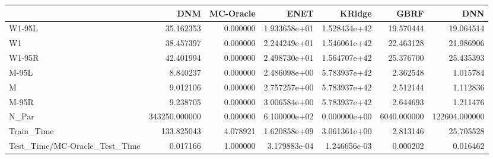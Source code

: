 \begin{tabular}{lrrrrrr}
\toprule
{} &            DNM &  MC-Oracle &          ENET &        KRidge &         GBRF &            DNN \\
\midrule
W1-95L                        &      35.162353 &   0.000000 &  1.933658e+01 &  1.528434e+42 &    19.570444 &      19.064514 \\
W1                            &      38.457397 &   0.000000 &  2.244249e+01 &  1.546061e+42 &    22.463128 &      21.986906 \\
W1-95R                        &      42.401994 &   0.000000 &  2.498730e+01 &  1.564707e+42 &    25.376700 &      25.435393 \\
M-95L                         &       8.840237 &   0.000000 &  2.486098e+00 &  5.783937e+42 &     2.362548 &       1.015784 \\
M                             &       9.012106 &   0.000000 &  2.757257e+00 &  5.783937e+42 &     2.512144 &       1.112836 \\
M-95R                         &       9.238705 &   0.000000 &  3.006584e+00 &  5.783937e+42 &     2.644693 &       1.211476 \\
N\_Par                         &  343250.000000 &   0.000000 &  6.100000e+02 &  0.000000e+00 &  6040.000000 &  122604.000000 \\
Train\_Time                    &     133.825043 &   4.078921 &  1.620858e+09 &  3.061361e+00 &     2.813146 &      25.705528 \\
Test\_Time/MC-Oracle\_Test\_Time &       0.017166 &   1.000000 &  3.179883e-04 &  1.246656e-03 &     0.000202 &       0.016462 \\
\bottomrule
\end{tabular}
